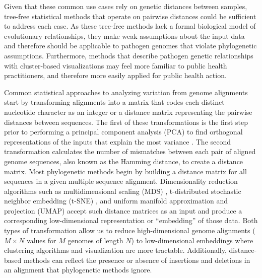 \documentclass[10pt,letterpaper]{article}
\begin{document}
Given that these common use cases rely on genetic distances between samples, tree-free statistical methods that operate on pairwise distances could be sufficient to address each case.
As these tree-free methods lack a formal biological model of evolutionary relationships, they make weak assumptions about the input data and therefore should be applicable to pathogen genomes that violate phylogenetic assumptions.
Furthermore, methods that describe pathogen genetic relationships with cluster-based visualizations may feel more familiar to public health practitioners, and therefore more easily applied for public health action.

Common statistical approaches to analyzing variation from genome alignments start by transforming alignments into a matrix that codes each distinct nucleotide character as an integer or a distance matrix representing the pairwise distances between sequences.
The first of these transformations is the first step prior to performing a principal component analysis (PCA) to find orthogonal representations of the inputs that explain the most variance \cite{jolliffe_cadima_2016}.
The second transformation calculates the number of mismatches between each pair of aligned genome sequences, also known as the Hamming distance, to create a distance matrix.
Most phylogenetic methods begin by building a distance matrix for all sequences in a given multiple sequence alignment.
Dimensionality reduction algorithms such as multidimensional scaling (MDS) \cite{hout_papesh_goldinger_2012}, t-distributed stochastic neighbor embedding (t-SNE) \cite{maaten2008visualizing}, and uniform manifold approximation and projection (UMAP) \cite{lel2018umap} accept such distance matrices as an input and produce a corresponding low-dimensional representation or ``embedding'' of those data.
Both types of transformation allow us to reduce high-dimensional genome alignments ($M \times N$ values for $M$ genomes of length $N$) to low-dimensional embeddings where clustering algorithms and visualization are more tractable.
Additionally, distance-based methods can reflect the presence or absence of insertions and deletions in an alignment that phylogenetic methods ignore.
\end{document}
